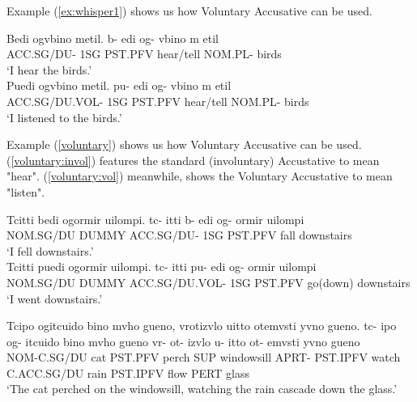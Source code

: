 \documentclass[12pt]{article}
\newcommand{\exref}[1]{(\ref{#1})}
\begin{document}
Example \exref{ex:whisper1} shows us how Voluntary Accusative can be used.\\

\newpage

\begin{exe}
\ex \label{voluntary}
\begin{xlist}
\ex \label{voluntary:invol}
Bedi ogvbino metil.
\gll
b-         edi og-     vbino     m       etil \\
ACC.SG/DU- 1SG PST.PFV hear/tell NOM.PL- birds \\
\trans `I hear the birds.'\\

\ex \label{voluntary:vol}
Puedi ogvbino metil.
\gll
pu-            edi og-     vbino     m       etil \\
ACC.SG/DU.VOL- 1SG PST.PFV hear/tell NOM.PL- birds \\
\trans `I listened to the birds.'\\
\end{xlist}
\end{exe}

Example \exref{voluntary} shows us how Voluntary Accusative can be used.
\exref{voluntary:invol} features the standard (involuntary) Accustative to mean "hear".
\exref{voluntary:vol} meanwhile, shows the Voluntary Accustative to mean "listen".

\begin{exe}
\ex \label{fall}
\begin{xlist}
\ex \label{fall:invol}
Tcitti bedi ogormir uilompi.
\gll
tc-       itti  b-         edi og-     ormir uilompi\\
NOM.SG/DU DUMMY ACC.SG/DU- 1SG PST.PFV fall  downstairs\\
\trans `I fell downstairs.'\\

\ex \label{fall:vol}
Tcitti puedi ogormir uilompi.
\gll
tc-       itti  pu-            edi og-     ormir    uilompi\\
NOM.SG/DU DUMMY ACC.SG/DU.VOL- 1SG PST.PFV go(down) downstairs\\
\trans `I went downstairs.'\\
\end{xlist}
\end{exe}

\newpage

\begin{exe}
\ex \label{ex:catwindow}
Tcipo ogitcuido bino mvho gueno, vrotizvlo uitto otemvsti yvno gueno.
\gll
tc-         ipo og-     itcuido bino {mvho gueno} vr-   ot-      izvlo u-          itto ot-      emvsti yvno gueno\\
NOM-C.SG/DU cat PST.PFV perch   SUP  windowsill   APRT- PST.IPFV watch C.ACC.SG/DU rain PST.IPFV flow   PERT glass\\
\trans `The cat perched on the windowsill, watching the rain cascade down the glass.'\\
\end{exe}
\end{document}
